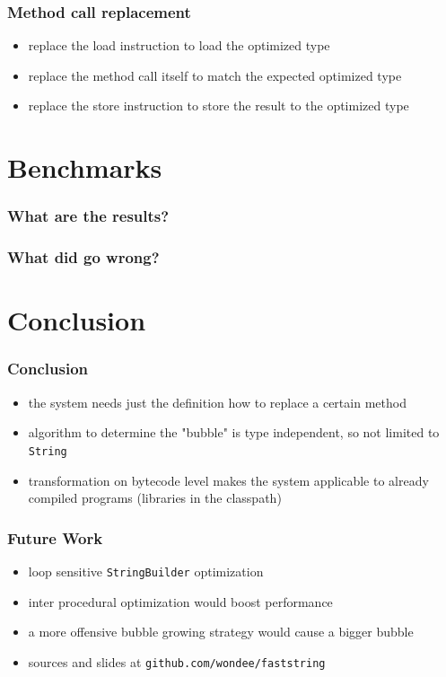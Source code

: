 \documentclass{beamer}
\begin{document}
\begin{frame}
  \frametitle{Method call replacement}  
  \begin{itemize}
    \item replace the load instruction to load the optimized type
    \item replace the method call itself to match the expected optimized type
    \item replace the store instruction to store the result to the optimized type
  \end{itemize}
\end{frame}

\section{Benchmarks}

\frame{\sectionpage}

\begin{frame}
	\frametitle{What are the results?}

\end{frame}


\begin{frame}
	\frametitle{What did go wrong?}

\end{frame}

\section{Conclusion}

\frame{\sectionpage}

\begin{frame}
	\frametitle{Conclusion}
	\begin{itemize}
    \item the system needs just the definition how to replace a certain method
		\item algorithm to determine the "bubble" is type independent, so not limited to \texttt{String}
		\item transformation on bytecode level makes the system applicable to already compiled programs (libraries in the classpath) 
	\end{itemize}
\end{frame}

\begin{frame}
	\frametitle{Future Work}
  \begin{itemize}
    \item loop sensitive \texttt{StringBuilder} optimization 
    \item inter procedural optimization would boost performance 
    \item a more offensive bubble growing strategy would cause a bigger bubble
    \item sources and slides at \texttt{github.com/wondee/faststring}
  \end{itemize}
\end{frame}
\end{document}
